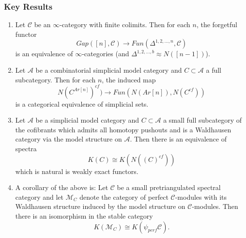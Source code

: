 \documentclass[letterpaper]{article}
\theoremstyle{definition}
\newcommand{\mc}{\mathcal}
\begin{document}
\subsubsection{Key Results}
\begin{enumerate}
\item Let $\mc C$ be an $\infty$-category with finite colimits. Then
  for each $n$, the forgetful functor
\[
Gap([n],\mc C) \rightarrow Fun(\Delta^{1,2,\dots,n},\mc C)
\]
is an equivalence of $\infty$-categories (and $\Delta^{1,2,\dots,b}
\approx N([n-1])$).
\item Let $\mc A$ be a combinatorial simplicial model category and $C
  \subset \mc A$ a full subcategory. Then for each $n$, the induced
  map
\[
N(C^{Ar[n]})^{cf}) \rightarrow Fun(N(Ar[n]),N(C^{cf}))
\]
is a categorical equivalence of simplicial sets.

\item Let $\mc A$ be a simplicial model category and $C \subset \mc A$
  a small full subcategory of the cofibrants which admits all homotopy
  pushouts and is a Waldhausen category via the model structure on
  $\mc A$. Then there is an equivalence of spectra
\[
K(C) \cong K(N((C)^{cf}))
\]
which is natural is weakly exact functors. 


\item A corollary of the above is: Let $\mc C$ be a small
  pretriangulated spectral category and let $\mc M_C$ denote the
  category of perfect $\mc C$-modules with its Waldhausen structure
  induced by the model structure on $\mc C$-modules. Then there is an
  isomorphism in the stable category
\[
K(\mc M_C) \cong K(\psi_{perf}\mc C).
\]


\end{enumerate}
\end{document}
